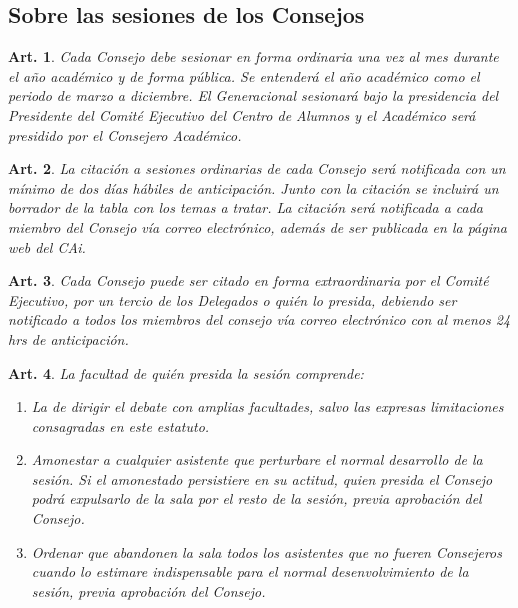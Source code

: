 \documentclass[letterpaper,11pt]{article}
\theoremstyle{plain}
\newtheorem{art}{Art.} %
\begin{document}
		\subsection*{Sobre las sesiones de los Consejos}

			\begin{art}\label{consejos}
				Cada Consejo debe sesionar en forma ordinaria una vez al mes durante el año académico y de forma pública. Se entenderá el año académico como el periodo de marzo a diciembre. El Generacional sesionará bajo la presidencia del Presidente del Comité Ejecutivo del Centro de Alumnos y el Académico será presidido por el Consejero Académico.
			\end{art}

			\begin{art}\label{consejoOrdinario}
				La citación a sesiones ordinarias de cada Consejo será notificada con un mínimo de dos días hábiles de anticipación. Junto con la citación se incluirá un borrador de la tabla con los temas a tratar. La citación será notificada a cada miembro del Consejo vía correo electrónico, además de ser publicada en la página web del CAi.
			\end{art}

			\begin{art}\label{consejoExtraordinario}
				Cada Consejo puede ser citado en forma extraordinaria por el Comité Ejecutivo, por un tercio de los Delegados o quién lo presida, debiendo ser notificado a todos los miembros del consejo vía correo electrónico con al menos 24 hrs de anticipación.
			\end{art}

			\begin{art}\label{facultadesPrecide}
				La facultad de quién presida la sesión comprende:
				\begin{enumerate}
					\item La de dirigir el debate con amplias facultades, salvo las expresas limitaciones consagradas en este estatuto.
					\item Amonestar a cualquier asistente que perturbare el normal desarrollo de la sesión. Si el amonestado persistiere en su actitud,  quien presida el Consejo podrá expulsarlo de la sala por el resto de la sesión, previa aprobación del Consejo.
					\item Ordenar que abandonen la sala todos los asistentes que no fueren Consejeros cuando lo estimare indispensable para el normal desenvolvimiento de la sesión, previa aprobación del Consejo.
				\end{enumerate}
			\end{art}
\end{document}

